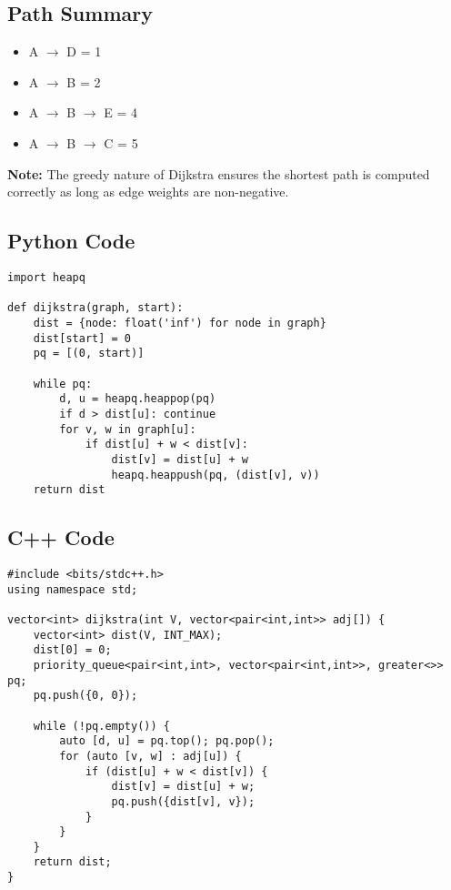 \documentclass[14pt,a4paper]{extarticle}
\begin{document}
\subsection*{Path Summary}
\begin{itemize}
    \item A $\rightarrow$ D = 1
    \item A $\rightarrow$ B = 2
    \item A $\rightarrow$ B $\rightarrow$ E = 4
    \item A $\rightarrow$ B $\rightarrow$ C = 5
\end{itemize}

\textbf{Note:} The greedy nature of Dijkstra ensures the shortest path is computed correctly as long as edge weights are non-negative.



\newpage
\subsection*{Python Code}
\begin{lstlisting}[style=python, caption={Dijkstra’s Algorithm in Python}]
import heapq

def dijkstra(graph, start):
    dist = {node: float('inf') for node in graph}
    dist[start] = 0
    pq = [(0, start)]

    while pq:
        d, u = heapq.heappop(pq)
        if d > dist[u]: continue
        for v, w in graph[u]:
            if dist[u] + w < dist[v]:
                dist[v] = dist[u] + w
                heapq.heappush(pq, (dist[v], v))
    return dist
\end{lstlisting}

\subsection*{C++ Code}
\begin{lstlisting}[style=cpp, caption={Dijkstra’s Algorithm in C++}]
#include <bits/stdc++.h>
using namespace std;

vector<int> dijkstra(int V, vector<pair<int,int>> adj[]) {
    vector<int> dist(V, INT_MAX);
    dist[0] = 0;
    priority_queue<pair<int,int>, vector<pair<int,int>>, greater<>> pq;
    pq.push({0, 0});

    while (!pq.empty()) {
        auto [d, u] = pq.top(); pq.pop();
        for (auto [v, w] : adj[u]) {
            if (dist[u] + w < dist[v]) {
                dist[v] = dist[u] + w;
                pq.push({dist[v], v});
            }
        }
    }
    return dist;
}
\end{lstlisting}
\end{document}
